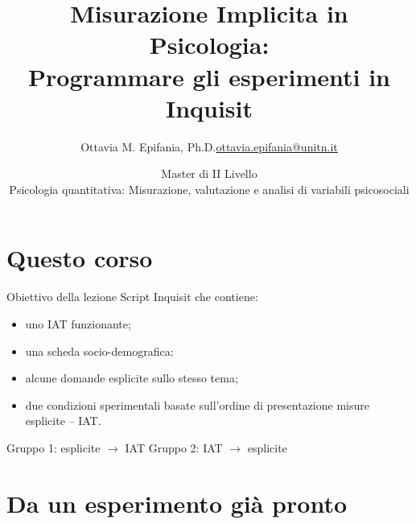 \documentclass[compress]{beamer}
\title[Experiment set up]{Misurazione Implicita in Psicologia:\\ Programmare gli esperimenti in Inquisit}
\date[PSQT, 2026]{Master di II Livello\\ Psicologia quantitativa: Misurazione, valutazione e analisi di variabili psicosociali}
\institute[]{11 settembre 2026, Padova}
\author[Ottavia M. Epifania]{\texorpdfstring{Ottavia M. Epifania, Ph.D.\newline\url{ottavia.epifania@unitn.it}}{Ottavia M. Epifania}}
\begin{document}
\begin{frame}[plain]
  \maketitle
\end{frame}

\section*{Questo corso}

\begin{frame}{Obiettivo della lezione}
Script Inquisit che contiene:

\vspace{3mm}
\begin{itemize}
  \item uno IAT funzionante;
  \item una scheda socio-demografica;
  \item alcune domande esplicite sullo stesso tema;
  \item due condizioni sperimentali basate sull'ordine di presentazione misure esplicite -- IAT.
\end{itemize}

\vspace{4mm}
\begin{exampleblock}{}
\centering
Gruppo 1: esplicite $\rightarrow$ IAT \qquad
Gruppo 2: IAT $\rightarrow$ esplicite
\end{exampleblock}
\end{frame}


\section{Da un esperimento già pronto}
\end{document}
